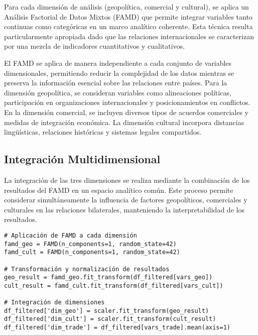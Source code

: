 \documentclass[11pt,a4paper]{article}
\begin{document}
Para cada dimensión de análisis (geopolítica, comercial y cultural), se aplica un Análisis Factorial de Datos Mixtos (FAMD) que permite integrar variables tanto continuas como categóricas en un marco analítico coherente. Esta técnica resulta particularmente apropiada dado que las relaciones internacionales se caracterizan por una mezcla de indicadores cuantitativos y cualitativos.

El FAMD se aplica de manera independiente a cada conjunto de variables dimensionales, permitiendo reducir la complejidad de los datos mientras se preserva la información esencial sobre las relaciones entre países. Para la dimensión geopolítica, se consideran variables como alineaciones políticas, participación en organizaciones internacionales y posicionamientos en conflictos. En la dimensión comercial, se incluyen diversos tipos de acuerdos comerciales y medidas de integración económica. La dimensión cultural incorpora distancias lingüísticas, relaciones históricas y sistemas legales compartidos.

\subsection{Integración Multidimensional}

La integración de las tres dimensiones se realiza mediante la combinación de los resultados del FAMD en un espacio analítico común. Este proceso permite considerar simultáneamente la influencia de factores geopolíticos, comerciales y culturales en las relaciones bilaterales, manteniendo la interpretabilidad de los resultados.

\begin{tcolorbox}[colback=codebackground,title=Integración de Dimensiones]
\begin{lstlisting}
# Aplicación de FAMD a cada dimensión
famd_geo = FAMD(n_components=1, random_state=42)
famd_cult = FAMD(n_components=1, random_state=42)

# Transformación y normalización de resultados
geo_result = famd_geo.fit_transform(df_filtered[vars_geo])
cult_result = famd_cult.fit_transform(df_filtered[vars_cult])

# Integración de dimensiones
df_filtered['dim_geo'] = scaler.fit_transform(geo_result)
df_filtered['dim_cult'] = scaler.fit_transform(cult_result)
df_filtered['dim_trade'] = df_filtered[vars_trade].mean(axis=1)
\end{lstlisting}
\end{tcolorbox}
\end{document}
